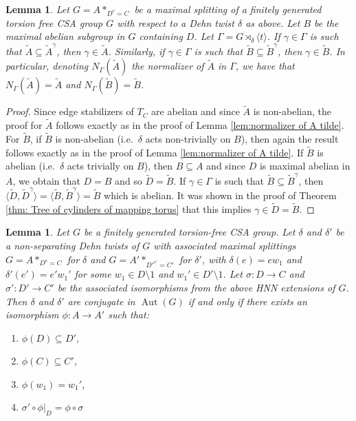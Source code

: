 \documentclass{amsart}
\DeclareMathOperator{\Aut}{Aut}
\theoremstyle{plain}
\newtheorem{lemma}[thm]{Lemma}
\theoremstyle{definition}
\theoremstyle{remark}
\begin{document}
\begin{lemma}
    \label{lem: normalizer of A tilde for non-separating}
    Let $G = A*_{D^e = C}$ be a maximal splitting of a finitely generated torsion free CSA group $G$ with respect to a Dehn twist $\delta$ as above. Let $B$ be the maximal abelian subgroup in $G$ containing $D$. Let $\Gamma = G \rtimes_{\delta} \langle t \rangle$. If $\gamma \in \Gamma$ is such that $\tilde{A} \subseteq \tilde{A}^{\gamma}$, then $\gamma \in \tilde{A}$. Similarly, if $\gamma \in \Gamma$ is such that $\tilde{B} \subseteq \tilde{B}^{\gamma}$, then $\gamma \in \tilde{B}$. In particular, denoting $N_{\Gamma}(\tilde{A})$ the normalizer of $\tilde{A}$ in $\Gamma$, we have that $N_{\Gamma}(\tilde{A}) = \tilde{A}$ and $N_{\Gamma}(\tilde{B}) = \tilde{B}$.
\end{lemma}

\begin{proof}
    Since edge stabilizers of $T_C$ are abelian and since $\tilde{A}$ is non-abelian, the proof for $\tilde{A}$ follows exactly as in the proof of Lemma \ref{lem:normalizer of A tilde}. For $\tilde{B}$, if $\tilde{B}$ is non-abelian (i.e.\ $\delta$ acts non-trivially on $B$), then again the result follows exactly as in the proof of Lemma \ref{lem:normalizer of A tilde}. If $\tilde{B}$ is abelian (i.e.\ $\delta$ acts trivially on $B$), then $B \subseteq A$ and since $D$ is maximal abelian in $A$, we obtain that $D = B$ and so $\tilde{D} = \tilde{B}$. If $\gamma \in \Gamma$ is such that $\tilde{B} \subseteq \tilde{B}^{\gamma}$, then $\langle \tilde{D}, \tilde{D}^{\gamma}\rangle = \langle \tilde{B}, \tilde{B}^{\gamma}\rangle = \tilde{B}$ which is abelian. It was shown in the proof of Theorem \ref{thm: Tree of cylinders of mapping torus} that this implies $\gamma \in \tilde{D} = \tilde{B}$.
\end{proof}

\begin{lemma}
    \label{lem: fibre and orientation preserving iso}
    Let $G$ be a finitely generated torsion-free CSA group. Let $\delta$ and $\delta'$ be a non-separating Dehn twists of $G$ with associated maximal splittings $G = A*_{D^e = C}$ for $\delta$ and $G = A'*_{D'^{e'} = C'}$ for $\delta'$, with $\delta(e) = ew_1$ and $\delta'(e') = e'w_1'$ for some $w_1 \in D \setminus 1$ and $w_1' \in D' \setminus 1$. Let $\sigma : D \to C$ and $\sigma' : D' \to C'$ be the associated isomorphisms from the above HNN extensions of $G$. Then $\delta$ and $\delta'$ are conjugate in $\Aut(G)$ if and only if there exists an isomorphism $\phi: A \to A'$ such that: 
    
    \begin{enumerate}
        \item $\phi(D) \subseteq D'$,
        \item $\phi(C) \subseteq C'$,
        \item $\phi(w_1) = w_1'$,
        \item $\sigma' \circ \phi \vert_D = \phi \circ \sigma$
    \end{enumerate}
    
\end{lemma}
\end{document}
